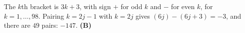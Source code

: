 The $k$th bracket is $3k+3$, with sign $+$ for odd $k$ and $-$ for even $k$, for $k=1,\dots,98$. Pairing $k=2j-1$ with $k=2j$ gives $(6j)-(6j+3)=-3$, and there are $49$ pairs: $-147$. \textbf{(B)}
